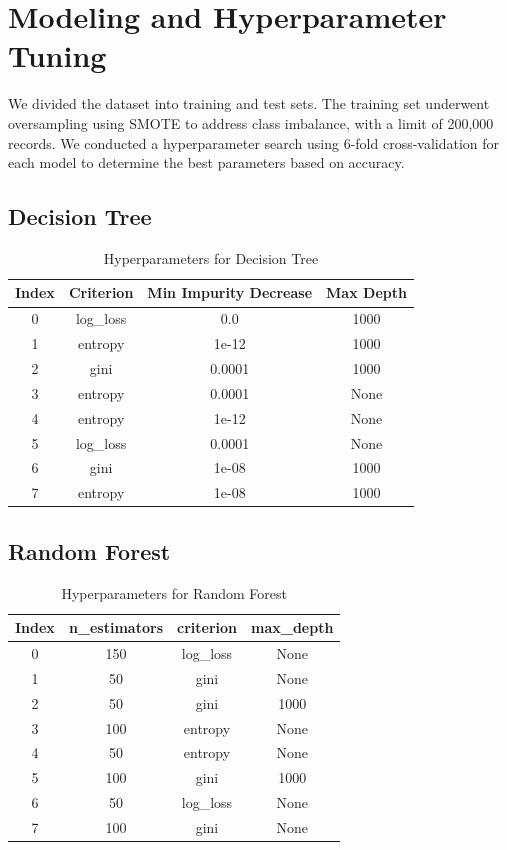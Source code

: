 \documentclass[twocolumn]{article}
\begin{document}
\section{Modeling and Hyperparameter Tuning}
We divided the dataset into training and test sets. The training set underwent oversampling using SMOTE to address class imbalance, with a limit of 200,000 records. We conducted a hyperparameter search using 6-fold cross-validation for each model to determine the best parameters based on accuracy.

\subsection{Decision Tree}
\begin{table}[h!]
    \centering
    \begin{tabular}{@{}cccc@{}}
        \toprule
        \textbf{Index} & \textbf{Criterion} & \textbf{Min Impurity Decrease} & \textbf{Max Depth} \\ \midrule
        0 & log\_loss & 0.0 & 1000 \\
        1 & entropy & 1e-12 & 1000 \\
        2 & gini & 0.0001 & 1000 \\
        3 & entropy & 0.0001 & None \\
        4 & entropy & 1e-12 & None \\
        5 & log\_loss & 0.0001 & None \\
        6 & gini & 1e-08 & 1000 \\
        7 & entropy & 1e-08 & 1000 \\ \bottomrule
    \end{tabular}
    \caption{Hyperparameters for Decision Tree}
\end{table}

\subsection{Random Forest}
\begin{table}[h!]
    \centering
    \begin{tabular}{@{}cccc@{}}
        \toprule
        \textbf{Index} & \textbf{n\_estimators} & \textbf{criterion} & \textbf{max\_depth} \\ \midrule
        0 & 150 & log\_loss & None \\
        1 & 50 & gini & None \\
        2 & 50 & gini & 1000 \\
        3 & 100 & entropy & None \\
        4 & 50 & entropy & None \\
        5 & 100 & gini & 1000 \\
        6 & 50 & log\_loss & None \\
        7 & 100 & gini & None \\ \bottomrule
    \end{tabular}
    \caption{Hyperparameters for Random Forest}
\end{table}
\end{document}

